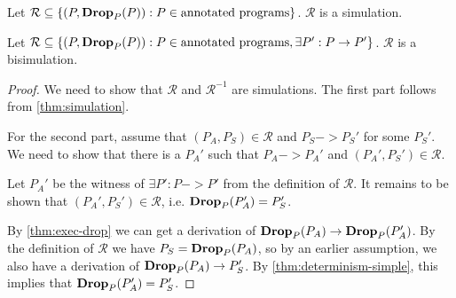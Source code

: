 \begin{corollary}[Simulation]
  \label{thm:simulation}
  Let
  $\mathcal{R} \subseteq \{(P, \mathbf{Drop}_{{P}}({P})) : P \in \text{annotated
    programs}\}$. $\mathcal{R}$ is a simulation.
\end{corollary}

\begin{theorem}[Bisimulation]
  \label{thm:bisimulation}
  Let
  $\mathcal{R} \subseteq \{(P, \mathbf{Drop}_{{P}}({P})) : P \in \text{annotated programs},
  \exists P' : P -> P'\}$. $\mathcal{R}$ is a bisimulation.
\end{theorem}
\begin{proof}
  We need to show that $\mathcal{R}$ and $\mathcal{R}^{-1}$ are simulations. The
  first part follows from \autoref{thm:simulation}.

  For the second part, assume that $(P_A, P_S) \in \mathcal{R}$ and
  $P_S -> P_S'$ for some $P_S'$. We need to show that there is a $P_A'$ such
  that $P_A -> P_A'$ and $(P_A', P_S') \in \mathcal{R}$.

  Let $P_A'$ be the witness of $\exists P' : P -> P'$ from the definition of
  $\mathcal{R}$. It remains to be shown that $(P_A', P_S') \in \mathcal{R}$,
  i.e. $\mathbf{Drop}_{{P}}({P_A'}) = P_S'$.

  By \autoref{thm:exec-drop} we can get a derivation of
  $\mathbf{Drop}_{{P}}({P_A}) -> \mathbf{Drop}_{{P}}({P_A'})$. By the definition of $\mathcal{R}$ we have
  $P_S = \mathbf{Drop}_{{P}}({P_A})$, so by an earlier assumption, we also have a derivation
  of $\mathbf{Drop}_{{P}}({P_A}) -> P_S'$. By \autoref{thm:determinism-simple}, this implies that $\mathbf{Drop}_{{P}}({P_A'}) = P_S'$.
\end{proof}
